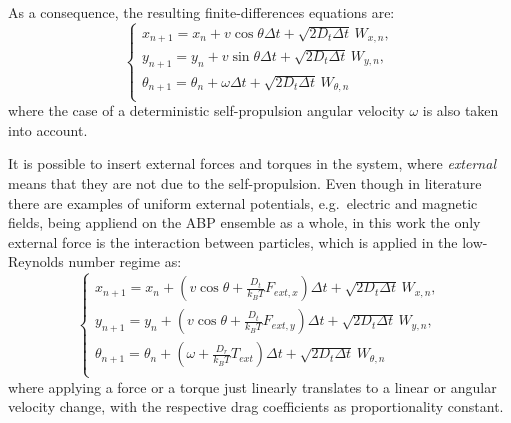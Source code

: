 \documentclass[../master_thesis_np.tex]{subfiles}
\begin{document}
	As a consequence, the resulting finite-differences equations are:
	\begin{equation} \label{eq:fin_diff1}
		\begin{cases}
			x_{n+1} = x_n + v \cos\theta \Delta t + \sqrt{2D_t \Delta t} \, W_{x,n},\\
			y_{n+1} = y_n + v \sin\theta \Delta t + \sqrt{2D_t \Delta t} \, W_{y,n},\\
			\theta_{n+1} = \theta_n + \omega \Delta t + \sqrt{2D_t \Delta t} \, W_{\theta,n}\\
		\end{cases}
	\end{equation}
	where the case of a deterministic self-propulsion angular velocity $\omega$ is also taken into account.

	It is possible to insert external forces and torques in the system, where \emph{external} means that they are not due to the self-propulsion. Even though in literature there are examples of uniform external potentials, e.g.\ electric and magnetic fields, being appliend on the ABP ensemble as a whole, in this work the only external force is the interaction between particles, which is applied in the low-Reynolds number regime as:
	\begin{equation} \label{eq:fin_diff_with_forces}
		\begin{cases}
			x_{n+1} = x_n + \left( v \cos\theta + \frac{D_t}{k_B T} F_{ext,x} \right) \Delta t + \sqrt{2D_t \Delta t} \, W_{x,n},\\
			y_{n+1} = y_n + \left( v \cos\theta + \frac{D_t}{k_B T} F_{ext,y} \right) \Delta t + \sqrt{2D_t \Delta t} \, W_{y,n},\\
			\theta_{n+1} = \theta_n +\left(\omega + \frac{D_r}{k_B T}{}T_{ext}\right) \Delta t + \sqrt{2D_t \Delta t} \, W_{\theta,n}\\
		\end{cases}
	\end{equation}
	where applying a force or a torque just linearly translates to a linear or angular velocity change, with the respective drag coefficients as proportionality constant.
\end{document}
